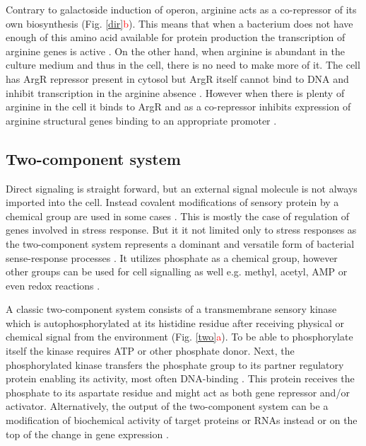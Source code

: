 Contrary to galactoside induction of  operon, arginine acts as a co-repressor of its own biosynthesis (Fig. \ref{dir}\textcolor{red}{b}).
This means that when a bacterium does not have enough of this amino acid available for protein production the transcription of arginine genes is active \cite{charlier2004biosynthesis, caldara2006arginine}.
On the other hand, when arginine is abundant in the culture medium and thus in the cell, there is no need to make more of it.
The cell has ArgR repressor present in cytosol but ArgR itself cannot bind to DNA and inhibit transcription in the arginine absence \cite{clark2005molecular, caldara2006arginine}.
However when there is plenty of arginine in the cell it binds to ArgR and as a co-repressor inhibits expression of arginine structural genes binding to an appropriate promoter \cite{charlier1992arginine, charlier2004biosynthesis, clark2005molecular}.

\subsection{Two-component system}
Direct signaling is straight forward, but an external signal molecule is not always imported into the cell.
Instead covalent modifications of sensory protein by a chemical group are used in some cases \cite{ninfa1986covalent, falke1997two}.
This is mostly the case of regulation of genes involved in stress response.
But it it not limited only to stress responses as the two-component system represents a dominant and versatile form of bacterial sense-response processes \cite{karniol2004hwe, kaczmarczyk2014complex, cui2018novel}.
It utilizes phosphate as a chemical group, however other groups can be used for cell signalling as well e.g. methyl, acetyl, AMP or even redox reactions \cite{kim2002oxyr, chaparro2010toxt, wang2010acetylation, you2013coordination}.

A classic two-component system consists of a transmembrane sensory kinase which is autophosphorylated at its histidine residue after receiving physical or chemical signal from the environment (Fig. \ref{two}\textcolor{red}{a}).
To be able to phosphorylate itself the kinase requires ATP or other phosphate donor.
Next, the phosphorylated kinase transfers the phosphate group to its partner regulatory protein enabling its activity, most often DNA-binding \cite{lynch2012prioritization, gao2015temporal, cui2018novel}.
This protein receives the phosphate to its aspartate residue and might act as both gene repressor and/or activator.
Alternatively, the output of the two-component system can be a modification of biochemical activity of target proteins or RNAs instead or on the top of the change in gene expression \cite{shu2002antar, chambonnier2016hybrid}.

